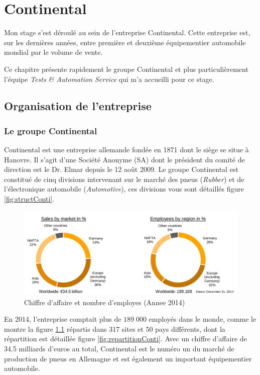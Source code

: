 \chapter{Continental}\label{chapConti}
\putminitoc
Mon stage s'est déroulé au sein de l'entreprise Continental. Cette entreprise est, sur les dernières années, entre première et deuxième équipementier automobile mondial par le volume de vente.

Ce chapitre présente rapidement le groupe Continental et plus particulièrement l'équipe \textit{Tests \& Automation Service} qui m'a accueilli pour ce stage.

	\section{Organisation de l'entreprise}
		\subsection{Le groupe Continental}

Continental est une entreprise allemande fondée en 1871 dont le siège se situe à Hanovre. Il s'agit d'une Société Anonyme (SA) dont le président du comité de
direction est le Dr. Elmar  depuis le 12 août 2009. Le groupe Continental est constitué de cinq divisions intervenant sur le marché des pneus (\textit{Rubber}) et de l'électronique automobile (\textit{Automotive}), ces divisions vous sont détaillés figure \ref{fig:structConti}.
	 
		 \begin{figure}[H]
		 	\centering
		 	\includegraphics[width=17cm]{contents/images/caConti.png}
		 	\caption[Chiffre d'affaire et nombre d'employes (Annee 2014)]{Chiffre d'affaire et nombre d'employes (Annee 2014)\footnotemark{}}
		 	\label{fig:caConti}
		 \end{figure}
		 En 2014, l'entreprise comptait plus de $189\;000$ employés dans le monde, comme le montre la figure \ref{fig:caConti} répartis dans 317 sites et 50 pays différents, dont la répartition est détaillée figure \ref{fig:repartitionConti}. Avec un chiffre d'affaire de 34.5 milliards d'euros au total, Continental est le numéro un du marché de production de pneus en Allemagne et est également un important équipementier automobile.

